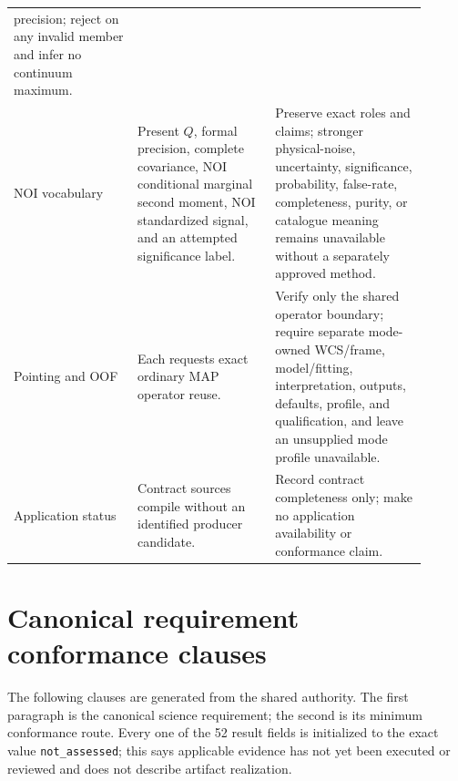\documentclass[10pt]{article}
\newcommand{\MaybeRequirementBreak}[1]{%
  \ifcsname SCIMapRequirementBreak#1\endcsname
    \csname SCIMapRequirementBreak#1\endcsname
  \fi}
\begin{document}
\begin{longtable}{L{0.27\linewidth}L{0.30\linewidth}L{0.33\linewidth}}
precision; reject on any invalid member and infer no continuum maximum.\\
NOI vocabulary & Present \(Q\), formal precision, complete covariance, NOI
conditional marginal second moment, NOI standardized signal, and an attempted
significance label. & Preserve exact roles and claims; stronger physical-noise,
uncertainty, significance, probability, false-rate, completeness, purity, or
catalogue meaning remains unavailable without a separately approved method.\\
Pointing and OOF & Each requests exact ordinary MAP operator reuse. & Verify
only the shared operator boundary; require separate mode-owned WCS/frame,
model/fitting, interpretation, outputs, defaults, profile, and qualification,
and leave an unsupplied mode profile unavailable.\\
Application status & Contract sources compile without an identified producer
candidate. & Record contract completeness only; make no application
availability or conformance claim.\\
\bottomrule
\end{longtable}

\SCIMapNOIOwnershipStatement

\clearpage
\section{Canonical requirement conformance clauses}\label{sec:requirements}

The following clauses are generated from the shared authority. The first
paragraph is the canonical science requirement; the second is its minimum
conformance route. Every one of the 52 result fields is initialized to the
exact value \texttt{not\_assessed}; this says applicable evidence has not yet
been executed or reviewed and does not describe artifact realization.

\renewcommand{\SCIMapRequirement}[4]{%
  \MaybeRequirementBreak{#1}%
  \phantomsection\label{engreq:#1}%
  \noindent\textbf{\textcolor{EngNavy}{#1} -- #2}\par\nobreak
  \textbf{Canonical clause:} #3\par
  \textbf{Minimum conformance evidence:} #4\par
  \textbf{Result:} \textcolor{EngGray}{\texttt{not\_assessed}}\par
  \smallskip\hrule\smallskip}
\begin{sloppypar}\small
\SCIMapRequirements
\end{sloppypar}\normalsize
\end{document}
